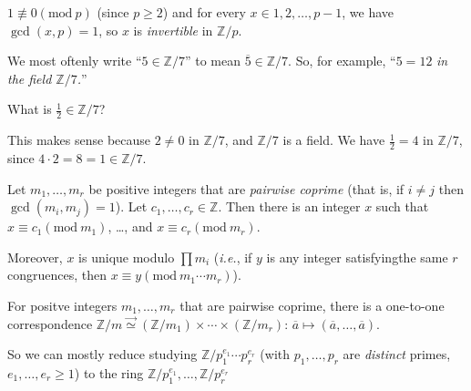 \documentclass{notes}
\begin{document}
\begin{prf}
  $1 \nequiv 0 (\mathrm{mod}\ p)$ (since $p \geq 2$) and for every $x \in 1, 2, \dots, p - 1$, we have $\gcd(x, p) = 1$, so $x$ is \textit{invertible} in $\mathbb Z / p$.
\end{prf}

\begin{rmk}
  We most oftenly write ``$5 \in \mathbb Z / 7$'' to mean $\overline 5 \in \mathbb Z / 7$.
  So, for example, ``$5 = 12$ \textit{in the field $\mathbb Z / 7$.}''
\end{rmk}

\begin{eg}
  What is $\frac{1}{2} \in \mathbb Z / 7$?

  This makes sense because $2 \neq 0$ in $\mathbb Z / 7$, and $\mathbb Z / 7$ is a field.
  We have $\frac{1}{2} = 4$ in $\mathbb Z / 7$, since $4 \cdot 2 = 8 = 1 \in \mathbb Z / 7$.
\end{eg}

\begin{thm}
  Let $m_1, \dots, m_r$ be positive integers that are \textit{pairwise coprime} (that is, if $i \neq j$ then $\gcd(m_i, m_j) = 1$).
  Let $c_1, \dots, c_r \in \mathbb Z$.
  Then there is an integer $x$ such that $x \equiv c_1 (\mathrm{mod}\ m_1)$, \dots, and $x \equiv c_r (\mathrm{mod}\ m_r)$.

  Moreover, $x$ is unique modulo $\prod m_i$ (\textit{i.e.}, if $y$ is any integer satisfyingthe same $r$ congruences, then $x \equiv y (\mathrm{mod}\ m_1 \cdots m_r)$).
\end{thm}

\begin{cor}
  For positve integers $m_1, \dots, m_r$ that are pairwise coprime, there is a one-to-one correspondence $\mathbb Z / m \overset{\longrightarrow}{\simeq} (\mathbb Z / m_1) \times \cdots \times (\mathbb Z / m_r)$: $\overline a \mapsto (\overline a, \dots, \overline a)$.

  So we can mostly reduce studying $\mathbb Z / p_1^{e_1} \cdots p_r^{e_r}$ (with $p_1, \dots, p_r$ are \textit{distinct} primes, $e_1, \dots, e_r \geq 1$) to the ring $\mathbb Z / p_1^{e_1}, \dots, \mathbb Z / p_r^{e_r}$
\end{cor}
\end{document}
